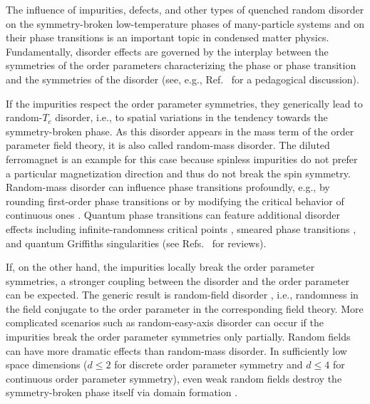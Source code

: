 \documentclass[twocolumn,showpacs,superscriptaddress,aps,prb]{revtex4-2}
\begin{document}
The influence of impurities, defects, and other types of quenched random disorder on the symmetry-broken
low-temperature phases of many-particle systems and on their phase transitions is an important topic
in condensed matter physics. Fundamentally, disorder effects are governed by the interplay between
the symmetries of the order parameters characterizing the phase or phase transition and the symmetries
of the disorder (see, e.g., Ref.\ \cite{Vojta19} for a pedagogical discussion).

If the impurities respect the order parameter symmetries, they generically lead to random-$T_c$
disorder, i.e., to spatial variations in the tendency towards the symmetry-broken phase.
As this disorder appears in the mass term of the order parameter field theory,
it is also called random-mass disorder. The diluted ferromagnet is an example for this case
because spinless impurities do not prefer a particular magnetization direction and thus do not
break the spin symmetry. Random-mass disorder can influence phase transitions profoundly, e.g.,
by rounding first-order phase transitions \cite{ImryWortis79,HuiBerker89,AizenmanWehr89}
or by modifying the critical behavior of continuous ones \cite{Harris74}. Quantum phase
transitions can feature additional disorder effects including infinite-randomness critical
points \cite{Fisher92,*Fisher95,MMHF00,HoyosKotabageVojta07,*VojtaKotabageHoyos09},
smeared phase transitions \cite{Vojta03a,*HoyosVojta08},
and quantum Griffiths singularities \cite{Griffiths69,ThillHuse95,RiegerYoung96,*YoungRieger96}
(see Refs.\ \cite{Vojta06,*Vojta10,Vojta13} for reviews).

If, on the other hand, the impurities locally break the order parameter symmetries, a stronger
coupling between the disorder and the order parameter can be expected. The generic result is
random-field disorder \cite{ImryMa75}, i.e., randomness in the field conjugate to the order parameter in the
corresponding field theory. More complicated scenarios such as random-easy-axis disorder
\cite{HarrisPlischkeZuckermann73,PelcovitsPytteRudnick78,Fisher85,DudkaFolkHolovatch05,Mirandaetal21}
can occur if the impurities break the order parameter symmetries only partially.
Random fields can have more dramatic effects than random-mass disorder.
In sufficiently low space dimensions ($d \le 2$ for discrete order parameter symmetry and $d\le 4$
for continuous order parameter symmetry), even weak random fields
destroy the symmetry-broken phase itself via domain formation \cite{ImryMa75,Binder83,AizenmanWehr89}.
\end{document}
